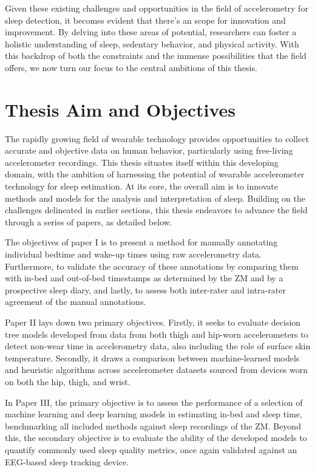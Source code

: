 \documentclass[
  10pt,
]{scrbook}
\begin{document}
Given these existing challenges and opportunities in the field of
accelerometry for sleep detection, it becomes evident that there's an
scope for innovation and improvement. By delving into these areas of
potential, researchers can foster a holistic understanding of sleep,
sedentary behavior, and physical activity. With this backdrop of both
the constraints and the immense possibilities that the field offers, we
now turn our focus to the central ambitions of this thesis.

\hypertarget{thesis-aim-and-objectives}{%
\section{Thesis Aim and Objectives}\label{thesis-aim-and-objectives}}

The rapidly growing field of wearable technology provides opportunities
to collect accurate and objective data on human behavior, particularly
using free-living accelerometer recordings. This thesis situates itself
within this developing domain, with the ambition of harnessing the
potential of wearable accelerometer technology for sleep estimation. At
its core, the overall aim is to innovate methods and models for the
analysis and interpretation of sleep. Building on the challenges
delineated in earlier sections, this thesis endeavors to advance the
field through a series of papers, as detailed below.

The objectives of paper I is to present a method for manually annotating
individual bedtime and wake-up times using raw accelerometry data.
Furthermore, to validate the accuracy of these annotations by comparing
them with in-bed and out-of-bed timestamps as determined by the ZM and
by a prospective sleep diary, and lastly, to assess both inter-rater and
intra-rater agreement of the manual annotations.

Paper II lays down two primary objectives. Firstly, it seeks to evaluate
decision tree models developed from data from both thigh and hip-worn
accelerometers to detect non-wear time in accelerometry data, also
including the role of surface skin temperature. Secondly, it draws a
comparison between machine-learned models and heuristic algorithms
across accelerometer datasets sourced from devices worn on both the hip,
thigh, and wrist.

In Paper III, the primary objective is to assess the performance of a
selection of machine learning and deep learning models in estimating
in-bed and sleep time, benchmarking all included methods against sleep
recordings of the ZM. Beyond this, the secondary objective is to
evaluate the ability of the developed models to quantify commonly used
sleep quality metrics, once again validated against an EEG-based sleep
tracking device.
\end{document}
